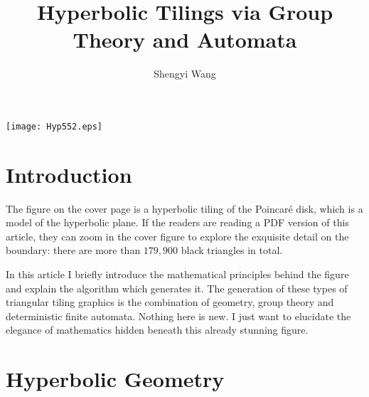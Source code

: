\documentclass[12pt]{article}
\title{Hyperbolic Tilings via Group Theory and Automata}
\author{Shengyi Wang}
\begin{document}
\maketitle

\begin{center}
  \texttt{[image: Hyp552.eps]}
\end{center}

\section{Introduction}

The figure on the cover page is a hyperbolic tiling of the Poincar\'e
disk, which is a model of the hyperbolic plane. If the readers are
reading a PDF version of this article, they can zoom in the cover
figure to explore the exquisite detail on the boundary: there are more
than $179,900$ black triangles in total.

In this article I briefly introduce the mathematical principles behind
the figure and explain the algorithm which generates it. The
generation of these types of triangular tiling graphics is the
combination of geometry, group theory and deterministic finite
automata. Nothing here is new. I just want to elucidate the elegance
of mathematics hidden beneath this already stunning figure.

\section{Hyperbolic Geometry}
\end{document}
